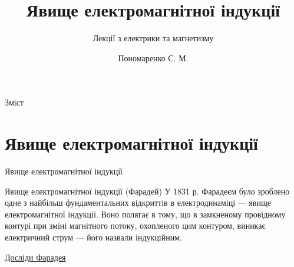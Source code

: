 \documentclass[onlytextwidth]{beamer}
\title[Лекції електрики та магнетизму]{\huge\bfseries Явище електромагнітної індукції}
\subtitle{Лекції з електрики та магнетизму}
\author{Пономаренко С. М.}
\date{}
\begin{document}
\begin{frame}[plain]
	\maketitle
\end{frame}

\begin{frame}{Зміст}{}
	\tableofcontents
\end{frame}



\section{Явище електромагнітної індукції}



\begin{frame}{Явище електромагнітної індукції}{}
	\begin{block}{Явище електромагнітної індукції (Фарадей)}\justifying
		У 1831 р. Фарадеєм було зроблено одне з найбільш фундаментальних відкриттів в електродинаміці --- \alert{явище електромагнітної індукції}. Воно
		полягає в тому, що в замкненому провідному контурі при зміні магнітного потоку, охопленого цим контуром, виникає електричний струм --- його назвали
		індукційним.
	\end{block}

	\vfill

	\href{https://youtu.be/GrBYG8NIUoU}{\color{blue}\small Досліди Фарадея}

\end{frame}
\end{document}
